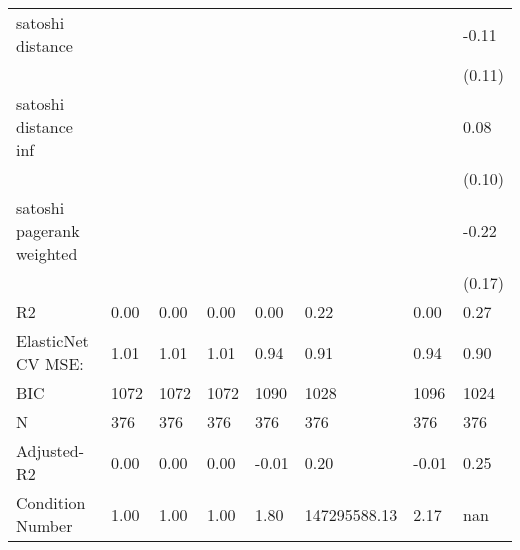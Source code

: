 \begin{table*}
\begin{center}
\begin{tabular}{llllllll}
satoshi distance                           &          &            &         &         &              &                    & -0.11    \\
                                                 &          &            &         &         &              &                    & (0.11)   \\
satoshi distance inf                       &          &            &         &         &              &                    & 0.08     \\
                                                 &          &            &         &         &              &                    & (0.10)   \\
satoshi pagerank weighted                  &          &            &         &         &              &                    & -0.22    \\
                                                 &          &            &         &         &              &                    & (0.17)   \\
R2                                               & 0.00     & 0.00       & 0.00    & 0.00    & 0.22         & 0.00               & 0.27     \\
ElasticNet CV MSE:                               & 1.01     & 1.01       & 1.01    & 0.94    & 0.91         & 0.94               & 0.90     \\
BIC                                              & 1072     & 1072       & 1072    & 1090    & 1028         & 1096               & 1024     \\
N                                                & 376      & 376        & 376     & 376     & 376          & 376                & 376      \\
Adjusted-R2                                      & 0.00     & 0.00       & 0.00    & -0.01   & 0.20         & -0.01              & 0.25     \\
Condition Number                                 & 1.00     & 1.00       & 1.00    & 1.80    & 147295588.13 & 2.17               & nan      \\
\hline
\end{tabular}
\end{center}
\end{table*}